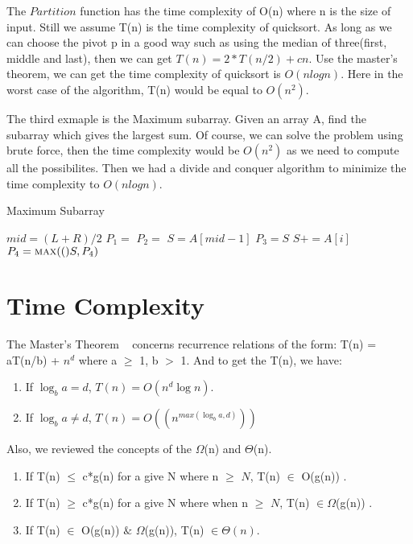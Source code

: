 \documentclass[usletter]{article}
\begin{document}
The $Partition$ function has the time complexity of O(n) where n is the size of input. Still we assume T(n) is the time complexity of quicksort. As long as we can choose the pivot p in a good way such as using the median of three(first, middle and last), then we can get $T(n)=2*T(n/2)+cn.$ Use the master's theorem, we can get the time complexity of quicksort is $O(nlogn)$. Here in the worst case of the algorithm, T(n) would be equal to $O(n^2)$.

The third exmaple is the Maximum subarray. Given an array A, find the subarray which gives the largest sum.
Of course, we can solve the problem using brute force, then the time complexity would be $O(n^2)$ as we need to compute all the possibilites. Then we had a divide and conquer algorithm to minimize the time complexity to $O(nlogn)$.
\begin{algorithm}
\caption{Maximum Subarray}
\begin{algorithmic}[1]
	\State $mid = (L+R)/2$
	\State $P_{1} = $
	\State $P_{2} = $
	\State $S = A[mid-1]$
	\State $P_{3} = S$
		\State $S+ = A[i]$
		\State $P_{4} = \Call {max}(S, P_{4})$
	\EndFor
	\Return {}
\EndIf
\EndProcedure
\end{algorithmic}
\end{algorithm}

\section{Time Complexity}
The Master's Theorem ~\cite{DPV} concerns recurrence relations of the form:
T(n) = aT(n/b) + $n^d$ where a $\ge$ 1, b $>$ 1.
And to get the T(n), we have:
\begin{enumerate}
  \item If $\log_b{a} = d$, $T(n) = O(n^d \log{n})$.
  \item If $\log_b{a} \neq d$, $T(n) = O((n^{max(\log_b{a}, d)}))$
\end{enumerate}
Also, we reviewed the concepts of the $\Omega$(n) and $\Theta$(n).
\begin{enumerate}
   \item If T(n) $\le$ c*g(n) for a give N where n $\ge$ $N$, T(n) $\in$ O(g(n)) .
   \item If T(n) $\ge$ c*g(n) for a give N where when n $\ge$ $N$, T(n) $\in \Omega$(g(n)) .
   \item If T(n) $\in$ O(g(n)) $\&$ $\Omega$(g(n)), T(n) $\in \Theta(n)$.
\end{enumerate}



\end{document}
